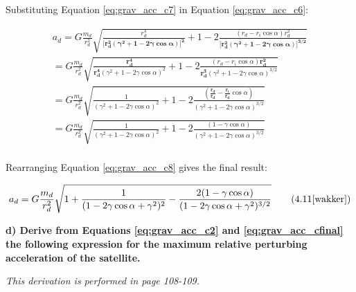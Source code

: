 \noindent Substituting Equation \ref{eq:grav_acc_c7} in Equation \ref{eq:grav_acc_c6}:

\begin{multline}
    a_{d} = G \frac{m_{d}}{r_{d}^2} \sqrt{\frac{r_{d}^4}{\boldsymbol{\bigg[ r_{d}^2(\gamma^2 + 1 - 2 \gamma\cos{\alpha}) \bigg]^2}} + 1 - 2\frac{(r_{d} - r_{i}\cos{\alpha}) r_{d}^2 }{\boldsymbol{\bigg[ r_{d}^2(\gamma^2 + 1 - 2 \gamma\cos{\alpha}) \bigg]^{3/2}}}} \\
    = G \frac{m_{d}}{r_{d}^2} \sqrt{\frac{\boldsymbol{r_{d}^4}}{ \boldsymbol{r_{d}^4}(\gamma^2 + 1 - 2 \gamma\cos{\alpha})^2} + 1 - 2\frac{(r_{d} - r_{i}\cos{\alpha}) \boldsymbol{r_{d}^2} }{\boldsymbol{r_{d}^3}(\gamma^2 + 1 - 2 \gamma\cos{\alpha})^{3/2}}} \\
    = G \frac{m_{d}}{r_{d}^2} \sqrt{\frac{1}{(\gamma^2 + 1 - 2 \gamma\cos{\alpha})^2} + 1 - 2\frac{(\boldsymbol{\frac{r_{d}}{r_{d}}} - \boldsymbol{\frac{r_{i}}{r_{d}}}\cos{\alpha}) }{(\gamma^2 + 1 - 2 \gamma\cos{\alpha})^{3/2}}} \\
    = G \frac{m_{d}}{r_{d}^2} \sqrt{\frac{1}{(\gamma^2 + 1 - 2 \gamma\cos{\alpha})^2} + 1 - 2\frac{(1 - \gamma\cos{\alpha}) }{(\gamma^2 + 1 - 2 \gamma\cos{\alpha})^{3/2}}} \\
    \label{eq:grav_acc_c8}
\end{multline}

\noindent Rearranging Equation \ref{eq:grav_acc_c8} gives the final result:

\begin{equation}
    a_{d} = G \frac{m_{d}}{r_{d}^2} \sqrt{1 + \frac{1}{(1 - 2 \gamma\cos{\alpha} + \gamma^2)^2} - \frac{2(1 - \gamma\cos{\alpha}) }{(1 - 2 \gamma\cos{\alpha} + \gamma^2)^{3/2}}}
    \tag{4.11\cite{wakker}}
    \label{eq:grav_acc_cfinal}
\end{equation}










\noindent \textbf{d) Derive from Equations \ref{eq:grav_acc_c2} and \ref{eq:grav_acc_cfinal} the following expression for the maximum relative perturbing acceleration of the satellite.}

\bigskip

\noindent \textit{This derivation is performed in \cite{wakker} page 108-109.}


